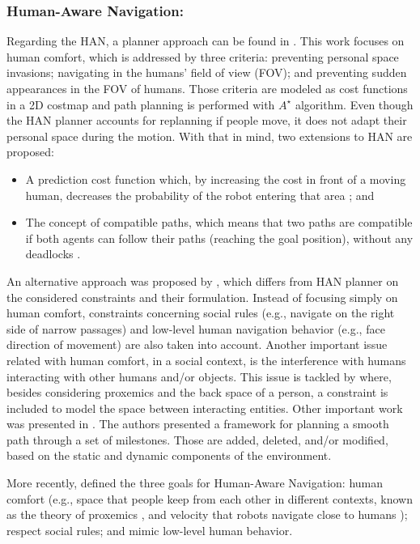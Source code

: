 \documentclass[5p,time]{elsarticle}
\begin{document}
\subsubsection{Human-Aware Navigation:} Regarding the HAN, a planner approach can be found in \cite{article:Sisbot:2006}. This work  focuses on human comfort, which is addressed by three criteria: preventing personal space invasions; navigating in the humans' field of view (FOV); and preventing sudden appearances in the FOV of humans. Those criteria are modeled as cost functions in a 2D costmap and path planning is performed with $A^{\star}$ algorithm. Even though the HAN planner accounts for replanning if people move, it does not adapt their personal space during the motion. With that in mind, two extensions to HAN are proposed:
\begin{itemize}
	\item{A prediction cost function which, by increasing the cost in front of a moving human, decreases the probability of the robot entering that area \cite{article:kruse:2010}} ; and
	\item{The concept of compatible paths, which means that two paths are compatible if both agents can follow their paths (reaching the goal position), without any deadlocks \cite{article:kruse:2012}.} 
\end{itemize}

An alternative approach was proposed by \cite{34}, which differs from HAN planner on the considered constraints and their formulation. Instead of focusing simply on human comfort, constraints concerning social rules (e.g., navigate on the right side of narrow passages) and low-level human navigation behavior (e.g., face direction of movement) are also taken into account. Another important issue related with human comfort, in a social context, is the interference with humans interacting with other humans and/or objects. This issue is tackled by \cite{21} where, besides considering proxemics and the back space of a person, a constraint is included to model the space between interacting entities. Other important work was presented in \cite{article:pandey:2010}. The authors presented a framework for planning a smooth path through a set of milestones. Those are added, deleted, and/or modified, based on the static and dynamic components of the environment.

More recently, \cite{article:kruse:2013} defined the three goals for Human-Aware Navigation: human comfort (e.g., space that people keep from each other in different contexts, known as the theory of proxemics \cite{33}, and velocity that robots navigate close to humans \cite{40}); respect social rules; and mimic low-level human behavior.
\end{document}
